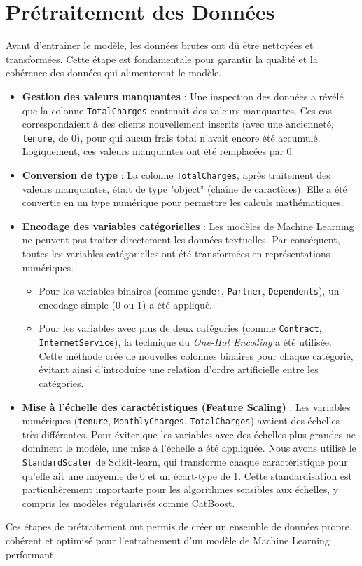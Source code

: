 \section{Prétraitement des Données}
Avant d'entraîner le modèle, les données brutes ont dû être nettoyées et transformées. Cette étape est fondamentale pour garantir la qualité et la cohérence des données qui alimenteront le modèle.

\begin{itemize}
    \item \textbf{Gestion des valeurs manquantes} : Une inspection des données a révélé que la colonne \texttt{TotalCharges} contenait des valeurs manquantes. Ces cas correspondaient à des clients nouvellement inscrits (avec une ancienneté, \texttt{tenure}, de 0), pour qui aucun frais total n'avait encore été accumulé. Logiquement, ces valeurs manquantes ont été remplacées par 0.

    \item \textbf{Conversion de type} : La colonne \texttt{TotalCharges}, après traitement des valeurs manquantes, était de type "object" (chaîne de caractères). Elle a été convertie en un type numérique pour permettre les calculs mathématiques.

    \item \textbf{Encodage des variables catégorielles} : Les modèles de Machine Learning ne peuvent pas traiter directement les données textuelles. Par conséquent, toutes les variables catégorielles ont été transformées en représentations numériques.
    \begin{itemize}
        \item Pour les variables binaires (comme \texttt{gender}, \texttt{Partner}, \texttt{Dependents}), un encodage simple (0 ou 1) a été appliqué.
        \item Pour les variables avec plus de deux catégories (comme \texttt{Contract}, \texttt{InternetService}), la technique du \textit{One-Hot Encoding} a été utilisée. Cette méthode crée de nouvelles colonnes binaires pour chaque catégorie, évitant ainsi d'introduire une relation d'ordre artificielle entre les catégories.
    \end{itemize}

    \item \textbf{Mise à l'échelle des caractéristiques (Feature Scaling)} : Les variables numériques (\texttt{tenure}, \texttt{MonthlyCharges}, \texttt{TotalCharges}) avaient des échelles très différentes. Pour éviter que les variables avec des échelles plus grandes ne dominent le modèle, une mise à l'échelle a été appliquée. Nous avons utilisé le \texttt{StandardScaler} de Scikit-learn, qui transforme chaque caractéristique pour qu'elle ait une moyenne de 0 et un écart-type de 1. Cette standardisation est particulièrement importante pour les algorithmes sensibles aux échelles, y compris les modèles régularisés comme CatBoost.
\end{itemize}

Ces étapes de prétraitement ont permis de créer un ensemble de données propre, cohérent et optimisé pour l'entraînement d'un modèle de Machine Learning performant.

